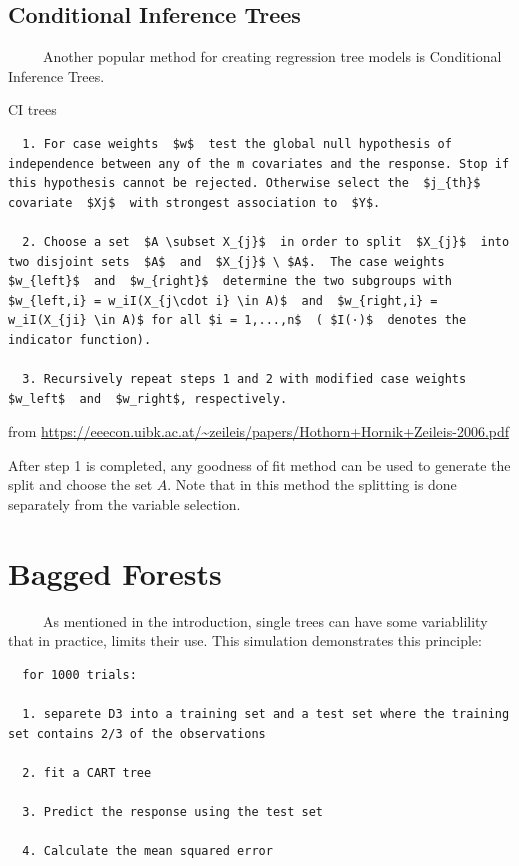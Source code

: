 \documentclass[12pt,twoside]{reedthesis}
\begin{document}
  \subsection{Conditional Inference
  Trees}\label{conditional-inference-trees}
  
  ~~~~~Another popular method for creating regression tree models is
  Conditional Inference Trees.
  
  CI trees
  
  \begin{verbatim}
  1. For case weights  $w$  test the global null hypothesis of independence between any of the m covariates and the response. Stop if this hypothesis cannot be rejected. Otherwise select the  $j_{th}$  covariate  $Xj$  with strongest association to  $Y$.
  
  2. Choose a set  $A \subset X_{j}$  in order to split  $X_{j}$  into two disjoint sets  $A$  and  $X_{j}$ \ $A$.  The case weights  $w_{left}$  and  $w_{right}$  determine the two subgroups with  $w_{left,i} = w_iI(X_{j\cdot i} \in A)$  and  $w_{right,i} = w_iI(X_{ji} \in A)$ for all $i = 1,...,n$  ( $I(·)$  denotes the indicator function). 
  
  3. Recursively repeat steps 1 and 2 with modified case weights  $w_left$  and  $w_right$, respectively. 
  \end{verbatim}
  
  from
  \url{https://eeecon.uibk.ac.at/~zeileis/papers/Hothorn+Hornik+Zeileis-2006.pdf}
  
  After step 1 is completed, any goodness of fit method can be used to
  generate the split and choose the set \(A\). Note that in this method
  the splitting is done separately from the variable selection.
  
  \section{Bagged Forests}\label{bagged-forests}
  
  ~~~~~As mentioned in the introduction, single trees can have some
  variablility that in practice, limits their use. This simulation
  demonstrates this principle:
  
  \begin{verbatim}
  for 1000 trials:
  
  1. separete D3 into a training set and a test set where the training set contains 2/3 of the observations
  
  2. fit a CART tree
  
  3. Predict the response using the test set 
  
  4. Calculate the mean squared error 
  \end{verbatim}
  
\end{document}
